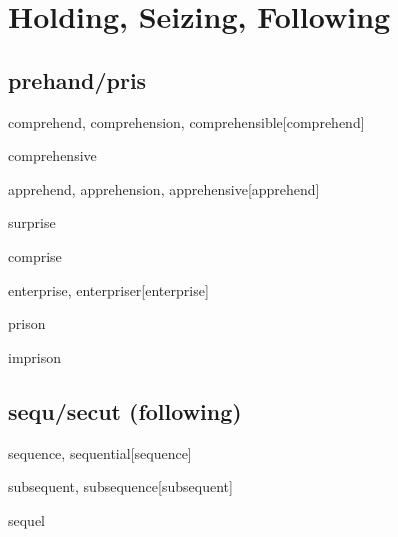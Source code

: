 \chapter{Holding, Seizing, Following}

\section{prehand/pris}

\begin{RefWord}{comprehend, comprehension, comprehensible}[comprehend]
\end{RefWord}

\begin{RefWord}{comprehensive}
\end{RefWord}

\begin{RefWord}{apprehend, apprehension, apprehensive}[apprehend]
\end{RefWord}

\begin{RefWord}{surprise}
\end{RefWord}

\begin{RefWord}{comprise}
\end{RefWord}

\begin{RefWord}{enterprise, enterpriser}[enterprise]
\end{RefWord}

\begin{RefWord}{prison}
\end{RefWord}

\begin{RefWord}{imprison}
\end{RefWord}

\section{sequ/secut (following)}

\begin{RefWord}{sequence, sequential}[sequence]
\end{RefWord}

\begin{RefWord}{subsequent, subsequence}[subsequent]
\end{RefWord}

\begin{RefWord}{sequel}
\end{RefWord}

